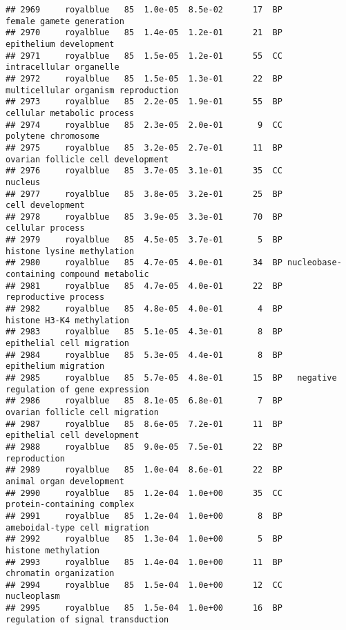 \documentclass[]{article}
\begin{document}
\begin{verbatim}
## 2969     royalblue   85  1.0e-05  8.5e-02      17  BP                 female gamete generation
## 2970     royalblue   85  1.4e-05  1.2e-01      21  BP                   epithelium development
## 2971     royalblue   85  1.5e-05  1.2e-01      55  CC                  intracellular organelle
## 2972     royalblue   85  1.5e-05  1.3e-01      22  BP      multicellular organism reproduction
## 2973     royalblue   85  2.2e-05  1.9e-01      55  BP               cellular metabolic process
## 2974     royalblue   85  2.3e-05  2.0e-01       9  CC                      polytene chromosome
## 2975     royalblue   85  3.2e-05  2.7e-01      11  BP        ovarian follicle cell development
## 2976     royalblue   85  3.7e-05  3.1e-01      35  CC                                  nucleus
## 2977     royalblue   85  3.8e-05  3.2e-01      25  BP                         cell development
## 2978     royalblue   85  3.9e-05  3.3e-01      70  BP                         cellular process
## 2979     royalblue   85  4.5e-05  3.7e-01       5  BP               histone lysine methylation
## 2980     royalblue   85  4.7e-05  4.0e-01      34  BP nucleobase-containing compound metabolic
## 2981     royalblue   85  4.7e-05  4.0e-01      22  BP                     reproductive process
## 2982     royalblue   85  4.8e-05  4.0e-01       4  BP                histone H3-K4 methylation
## 2983     royalblue   85  5.1e-05  4.3e-01       8  BP                epithelial cell migration
## 2984     royalblue   85  5.3e-05  4.4e-01       8  BP                     epithelium migration
## 2985     royalblue   85  5.7e-05  4.8e-01      15  BP   negative regulation of gene expression
## 2986     royalblue   85  8.1e-05  6.8e-01       7  BP          ovarian follicle cell migration
## 2987     royalblue   85  8.6e-05  7.2e-01      11  BP              epithelial cell development
## 2988     royalblue   85  9.0e-05  7.5e-01      22  BP                             reproduction
## 2989     royalblue   85  1.0e-04  8.6e-01      22  BP                 animal organ development
## 2990     royalblue   85  1.2e-04  1.0e+00      35  CC               protein-containing complex
## 2991     royalblue   85  1.2e-04  1.0e+00       8  BP            ameboidal-type cell migration
## 2992     royalblue   85  1.3e-04  1.0e+00       5  BP                      histone methylation
## 2993     royalblue   85  1.4e-04  1.0e+00      11  BP                   chromatin organization
## 2994     royalblue   85  1.5e-04  1.0e+00      12  CC                              nucleoplasm
## 2995     royalblue   85  1.5e-04  1.0e+00      16  BP        regulation of signal transduction

\end{verbatim}
\end{document}
